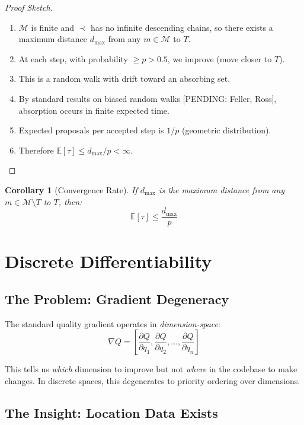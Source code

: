 \documentclass[11pt,a4paper]{article}
\newtheorem{corollary}[theorem]{Corollary}
\begin{document}
\begin{proof}[Proof Sketch]
\begin{enumerate}
  \item $\mathcal{M}$ is finite and $\prec$ has no infinite descending chains, so there exists a maximum distance $d_{\max}$ from any $m \in \mathcal{M}$ to $T$.
  \item At each step, with probability $\geq p > 0.5$, we improve (move closer to $T$).
  \item This is a random walk with drift toward an absorbing set.
  \item By standard results on biased random walks [PENDING: Feller, Ross], absorption occurs in finite expected time.
  \item Expected proposals per accepted step is $1/p$ (geometric distribution).
  \item Therefore $\mathbb{E}[\tau] \leq d_{\max}/p < \infty$. \qedhere
\end{enumerate}
\end{proof}

\begin{corollary}[Convergence Rate]
If $d_{\max}$ is the maximum distance from any $m \in \mathcal{M} \setminus T$ to $T$, then:
\[
\mathbb{E}[\tau] \leq \frac{d_{\max}}{p}
\]
\end{corollary}

\section{Discrete Differentiability}
\label{sec:differentiability}

\subsection{The Problem: Gradient Degeneracy}

The standard quality gradient operates in \emph{dimension-space}:
\[
\nabla Q = \left[\frac{\partial Q}{\partial q_1}, \frac{\partial Q}{\partial q_2}, \ldots, \frac{\partial Q}{\partial q_n}\right]
\]

This tells us \emph{which} dimension to improve but not \emph{where} in the codebase to make changes. In discrete spaces, this degenerates to priority ordering over dimensions.

\subsection{The Insight: Location Data Exists}
\end{document}

